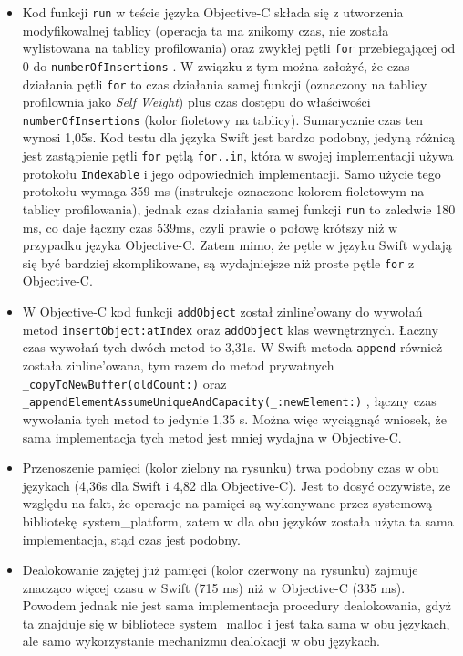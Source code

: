 \documentclass[mgr, shortabstract]{iithesis}
\newcommand{\swiftinline}[1]{
    \texttt{#1}
}
\newcommand{\objcinline}[1]{
    \texttt{#1}
}
\begin{document}
\begin{itemize}
    \item Kod funkcji \objcinline{run} w teście języka Objective-C składa się z utworzenia modyfikowalnej tablicy (operacja ta ma znikomy czas, nie została wylistowana na tablicy profilowania) oraz zwykłej pętli \texttt{for} przebiegającej od 0 do \objcinline{numberOfInsertions}. W związku z tym można założyć, że czas działania pętli \texttt{for} to czas działania samej funkcji (oznaczony na tablicy profilownia jako \textit{Self Weight}) plus czas dostępu do właściwości \objcinline{numberOfInsertions} (kolor fioletowy na tablicy). Sumarycznie czas ten wynosi 1,05s. Kod testu dla języka Swift jest bardzo podobny, jedyną różnicą jest zastąpienie pętli \texttt{for} pętlą \texttt{for..in}, która w swojej implementacji używa protokołu \swiftinline{Indexable} i jego odpowiednich implementacji. Samo użycie tego protokołu wymaga 359 ms (instrukcje oznaczone kolorem fioletowym na tablicy profilowania), jednak czas działania samej funkcji \swiftinline{run} to zaledwie 180 ms, co daje łączny czas 539ms, czyli prawie o połowę krótszy niż w przypadku języka Objective-C. Zatem mimo, że pętle w języku Swift wydają się być bardziej skomplikowane, są wydajniejsze niż proste pętle \texttt{for} z Objective-C.
    \item W Objective-C kod funkcji \objcinline{addObject} został zinline'owany do wywołań metod \objcinline{insertObject:atIndex} oraz \objcinline{addObject} klas wewnętrznych. Łaczny czas wywołań tych dwóch metod to 3,31s. W Swift metoda \swiftinline{append} również została zinline'owana, tym razem do metod prywatnych \swiftinline{_copyToNewBuffer(oldCount:)} oraz \swiftinline{_appendElementAssumeUniqueAndCapacity(_:newElement:)}, łączny czas wywołania tych metod to jedynie 1,35 s. Można więc wyciągnąć wniosek, że sama implementacja tych metod jest mniej wydajna w Objective-C.
    \item Przenoszenie pamięci (kolor zielony na rysunku) trwa podobny czas w obu językach (4,36s dla Swift i 4,82 dla Objective-C). Jest to dosyć oczywiste, ze względu na fakt, że operacje na pamięci są wykonywane przez systemową bibliotekę \textsf{system\_platform}, zatem w dla obu języków została użyta ta sama implementacja, stąd czas jest podobny.
    \item Dealokowanie zajętej już pamięci (kolor czerwony na rysunku) zajmuje znacząco więcej czasu w Swift (715 ms) niż w Objective-C (335 ms). Powodem jednak nie jest sama implementacja procedury dealokowania, gdyż ta znajduje się w bibliotece \textsf{system\_malloc} i jest taka sama w obu językach, ale samo wykorzystanie mechanizmu dealokacji w obu językach.

\end{itemize}
\end{document}

